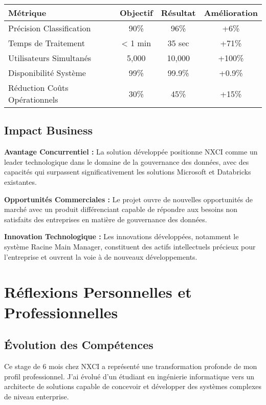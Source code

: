 \documentclass[a4paper,12pt]{article}
\begin{document}
\begin{center}
\begin{tabular}{|l|c|c|c|}
\hline
\textbf{Métrique} & \textbf{Objectif} & \textbf{Résultat} & \textbf{Amélioration} \\
\hline
Précision Classification & 90\% & 96\% & +6\% \\
\hline
Temps de Traitement & < 1 min & 35 sec & +71\% \\
\hline
Utilisateurs Simultanés & 5,000 & 10,000 & +100\% \\
\hline
Disponibilité Système & 99\% & 99.9\% & +0.9\% \\
\hline
Réduction Coûts Opérationnels & 30\% & 45\% & +15\% \\
\hline
\end{tabular}
\end{center}

\subsection{Impact Business}

\textbf{Avantage Concurrentiel :}
La solution développée positionne NXCI comme un leader technologique dans le domaine de la gouvernance des données, avec des capacités qui surpassent significativement les solutions Microsoft et Databricks existantes.

\textbf{Opportunités Commerciales :}
Le projet ouvre de nouvelles opportunités de marché avec un produit différenciant capable de répondre aux besoins non satisfaits des entreprises en matière de gouvernance des données.

\textbf{Innovation Technologique :}
Les innovations développées, notamment le système Racine Main Manager, constituent des actifs intellectuels précieux pour l'entreprise et ouvrent la voie à de nouveaux développements.

\newpage

\section{Réflexions Personnelles et Professionnelles}

\subsection{Évolution des Compétences}

Ce stage de 6 mois chez NXCI a représenté une transformation profonde de mon profil professionnel. J'ai évolué d'un étudiant en ingénierie informatique vers un architecte de solutions capable de concevoir et développer des systèmes complexes de niveau enterprise.
\end{document}
